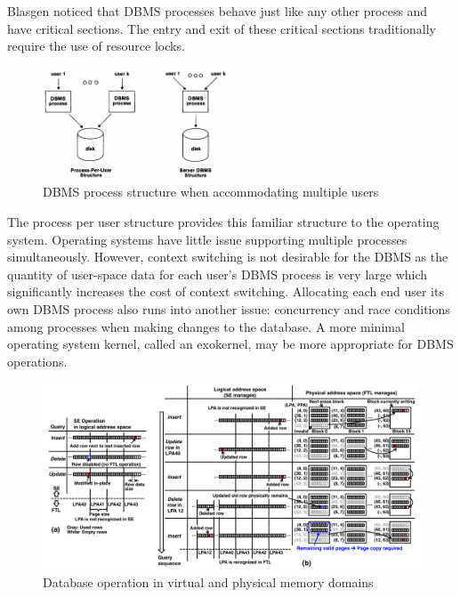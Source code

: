 \documentclass[letterpaper, 10 pt, conference]{ieeeconf}
\begin{document}
Blasgen noticed that DBMS processes behave just like any other process and have critical sections.  The entry and exit of these critical sections traditionally require the use of resource locks.  

\begin{figure}[H] %
	\centering
	\includegraphics [width=0.5\textwidth] {Figures/DBMS Process Multiple Users.png} 
    \caption{DBMS process structure when accommodating multiple users \cite{10}}
\end{figure}

The process per user structure provides this familiar structure to the operating system.  Operating systems have little issue supporting multiple processes simultaneously.  However, context switching is not desirable for the DBMS as the quantity of user-space data for each user’s DBMS process is very large which significantly increases the cost of context switching.  Allocating each end user its own DBMS process also runs into another issue: concurrency and race conditions among processes when making changes to the database.  A more minimal operating system kernel, called an exokernel, may be more appropriate for DBMS operations.
\newpage
\begin{figure}[H]%
	\centering
	\includegraphics [width=\textwidth]{Figures/DB Operation.png} 
    \caption{Database operation in virtual and physical memory domains \cite{11}}
\end{figure}
\end{document}
